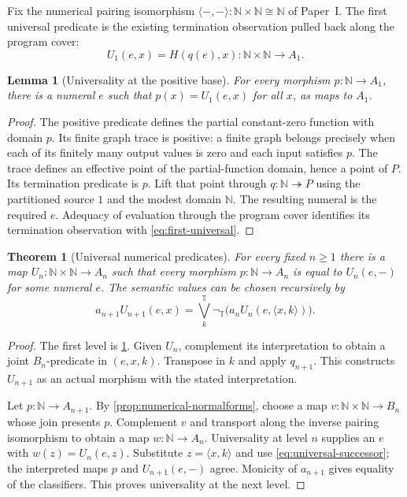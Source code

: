 \documentclass[11pt,a4paper]{article}
\numberwithin{equation}{section}
\newtheorem{theorem}{Theorem}[section]
\newtheorem{lemma}[lemma]{Lemma}
\theoremstyle{definition}
\theoremstyle{remark}
\theoremstyle{plain}
\newcommand{\N}{\mathbb N}
\newcommand{\TV}{\mathbb T}
\newcommand{\onto}{\twoheadrightarrow}
\newcommand{\negT}{\neg_{\TV}}
\newcommand{\joinT}{\bigvee^{\TV}}
\begin{document}
Fix the numerical pairing isomorphism
$\langle-,-\rangle:\N\times\N\cong\N$ of Paper~I.
The first universal predicate is the existing termination observation
pulled back along the program cover:
\begin{equation}\label{eq:first-universal}
 U_1(e,x)=H(q(e),x):\N\times\N\longrightarrow A_1.
\end{equation}

\begin{lemma}[Universality at the positive base]
\label{lem:base-universal}
For every morphism $p:\N\to A_1$, there is a numeral $e$ such that
$p(x)=U_1(e,x)$ for all $x$, as maps to $A_1$.
\end{lemma}
\begin{proof}
The positive predicate defines the partial constant-zero function with
domain $p$. Its finite graph trace is positive: a finite graph belongs
precisely when each of its finitely many output values is zero and
each input satisfies $p$. The trace defines an effective point of the
partial-function domain, hence a point of $P$. Its termination
predicate is $p$. Lift that point through $q:\N\onto P$ using the
partitioned source $1$ and the modest domain $\N$. The resulting
numeral is the required $e$. Adequacy of evaluation through the
program cover identifies its termination observation with
\eqref{eq:first-universal}.
\end{proof}

\begin{theorem}[Universal numerical predicates]
\label{thm:universal-predicates}
For every fixed $n\geq1$ there is a map
$U_n:\N\times\N\to A_n$ such that every morphism $p:\N\to A_n$
is equal to $U_n(e,-)$ for some numeral $e$. The semantic values can
be chosen recursively by
\begin{equation}\label{eq:universal-successor}
 a_{n+1}U_{n+1}(e,x)=
 \joinT_k\negT\bigl(a_nU_n(e,\langle x,k\rangle)\bigr).
\end{equation}
\end{theorem}
\begin{proof}
The first level is \cref{lem:base-universal}. Given $U_n$, complement
its interpretation to obtain a joint $B_n$-predicate in $(e,x,k)$.
Transpose in $k$ and apply $q_{n+1}$. This constructs $U_{n+1}$
as an actual morphism with the stated interpretation.

Let $p:\N\to A_{n+1}$. By
\cref{prop:numerical-normalforms}, choose a map
$v:\N\times\N\to B_n$ whose join presents $p$. Complement $v$
and transport along the inverse pairing isomorphism to obtain a map
$w:\N\to A_n$. Universality at level $n$ supplies an $e$ with
$w(z)=U_n(e,z)$. Substitute $z=\langle x,k\rangle$ and use
\eqref{eq:universal-successor}; the interpreted maps $p$ and
$U_{n+1}(e,-)$ agree. Monicity of $a_{n+1}$ gives equality of the
classifiers. This proves universality at the next level.
\end{proof}
\end{document}
